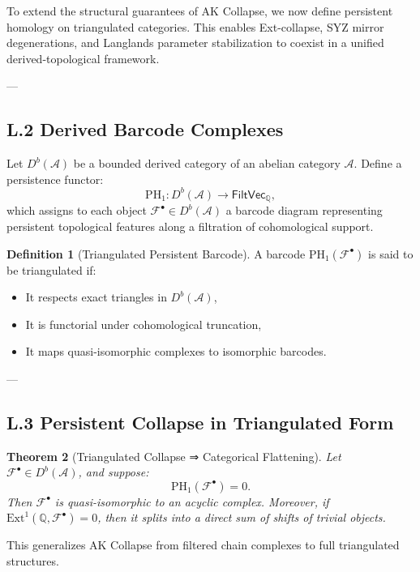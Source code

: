 \documentclass[11pt]{article}
\newtheorem{theorem}{Theorem}[section]
\theoremstyle{definition}
\newtheorem{definition}[theorem]{Definition}
\begin{document}
To extend the structural guarantees of AK Collapse, we now define persistent homology on triangulated categories.  
This enables Ext-collapse, SYZ mirror degenerations, and Langlands parameter stabilization to coexist in a unified derived-topological framework.

---

\subsection*{L.2 Derived Barcode Complexes}

Let \( D^b(\mathcal{A}) \) be a bounded derived category of an abelian category \( \mathcal{A} \).  
Define a persistence functor:
\[
\mathrm{PH}_1: D^b(\mathcal{A}) \longrightarrow \mathsf{FiltVec}_\mathbb{Q},
\]
which assigns to each object \( \mathcal{F}^\bullet \in D^b(\mathcal{A}) \) a barcode diagram representing persistent topological features along a filtration of cohomological support.

\begin{definition}[Triangulated Persistent Barcode]
A barcode \( \mathrm{PH}_1(\mathcal{F}^\bullet) \) is said to be triangulated if:
\begin{itemize}
  \item It respects exact triangles in \( D^b(\mathcal{A}) \),
  \item It is functorial under cohomological truncation,
  \item It maps quasi-isomorphic complexes to isomorphic barcodes.
\end{itemize}
\end{definition}

---

\subsection*{L.3 Persistent Collapse in Triangulated Form}

\begin{theorem}[Triangulated Collapse ⇒ Categorical Flattening]
Let \( \mathcal{F}^\bullet \in D^b(\mathcal{A}) \), and suppose:
\[
\mathrm{PH}_1(\mathcal{F}^\bullet) = 0.
\]
Then \( \mathcal{F}^\bullet \) is quasi-isomorphic to an acyclic complex.  
Moreover, if \( \mathrm{Ext}^1(\mathbb{Q}, \mathcal{F}^\bullet) = 0 \), then it splits into a direct sum of shifts of trivial objects.
\end{theorem}

This generalizes AK Collapse from filtered chain complexes to full triangulated structures.
\end{document}
